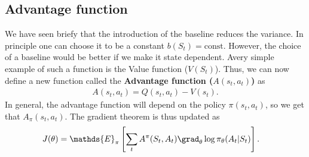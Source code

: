 \subsection{Advantage function}
We have seen briefy that the introduction of the baseline reduces the variance. In principle one can choose it to be a constant $b(S_t)=\text{const}$. However, the choice of a baseline would be better if we make it state dependent. Avery simple example of such a function is the Value function ($V(S_t)$). Thus, we can now define a new function called the \textbf{Advantage function ($A(s_t,a_t)$)} as 
\begin{align}
    A(s_t,a_t) = Q(s_t,a_t) - V(s_t).
\end{align}
In general, the advantage function will depend on the policy $\pi(s_t,a_t)$, so we get that $A_{\pi}(s_t,a_t)$. The gradient theorem is thus updated as 
\begin{align}
    J(\theta) &=  \mathds{E}_{\pi}\left[ \sum_{t} A^{\pi}(S_t,A_t) \grad_{\theta}\log \pi_{\theta}(A_t|S_t)\right].
\end{align}

